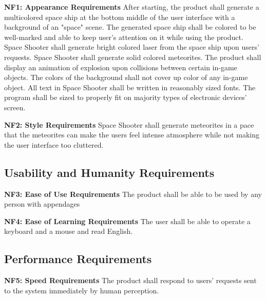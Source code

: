 \documentclass[12pt, titlepage]{article}
\begin{document}
\textbf{NF1: Appearance Requirements}
\newline
After starting, the product shall generate a multicolored space ship at the bottom middle of the user interface with a background of an "space" scene. The generated space ship shall be colored to be well-marked and able to keep user's attention on it while using the product.\newline \newline
Space Shooter shall generate bright colored laser from the space ship upon users' requests. Space Shooter shall generate solid colored meteorites. The product shall display an animation of explosion upon collisions between certain in-game objects.\newline \newline
The colors of the background shall not cover up color of any in-game object. All text in Space Shooter shall be written in reasonably sized fonts. The program shall be sized to properly fit on majority types of electronic devices' screen. \newline


\noindent \textbf{NF2: Style Requirements}
\newline
Space Shooter shall generate meteorites in a pace that the meteorites can make the users feel intense atmosphere while not making the user interface too cluttered.

\subsection{Usability and Humanity Requirements}

\textbf{NF3: Ease of Use Requirements}
\newline
The product shall be able to be used by any person with appendages
\newline

\noindent \textbf{NF4: Ease of Learning Requirements}
\newline
The user shall be able to operate a keyboard and a mouse and read English. 

\subsection{Performance Requirements}

\textbf{NF5: Speed Requirements}
\newline
The product shall respond to users' requests sent to the system immediately by human perception.
\newline
\end{document}
